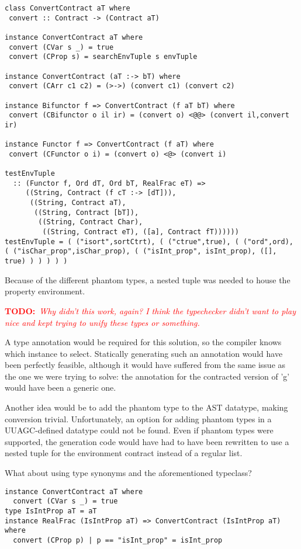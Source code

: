\documentclass[10pt]{report}
\newcommand{\annotate}[3]{
	\begin{scriptsize}
	\textcolor{#1}{\textbf{#2}~\textit{#3}}
	\end{scriptsize}\newline}
\newcommand{\todo}[1]{\annotate{red} {TODO:} {#1}}
\begin{document}
\begin{lstlisting}[caption=Attempt at using a typeclass to recover the extra type information.]
class ConvertContract aT where
 convert :: Contract -> (Contract aT)

instance ConvertContract aT where
 convert (CVar s _) = true
 convert (CProp s) = searchEnvTuple s envTuple

instance ConvertContract (aT :-> bT) where
 convert (CArr c1 c2) = (>->) (convert c1) (convert c2)

instance Bifunctor f => ConvertContract (f aT bT) where
 convert (CBifunctor o il ir) = (convert o) <@@> (convert il,convert ir)

instance Functor f => ConvertContract (f aT) where
 convert (CFunctor o i) = (convert o) <@> (convert i)
 
testEnvTuple
  :: (Functor f, Ord dT, Ord bT, RealFrac eT) =>
     ((String, Contract (f cT :-> [dT])),
      ((String, Contract aT),
       ((String, Contract [bT]),
        ((String, Contract Char),
         ((String, Contract eT), ([a], Contract fT))))))
testEnvTuple = ( ("isort",sortCtrt), ( ("ctrue",true), ( ("ord",ord), ( ("isChar_prop",isChar_prop), ( ("isInt_prop", isInt_prop), ([], true) ) ) ) ) )
\end{lstlisting}

Because of the different phantom types, a nested tuple was needed to house the property environment. \todo{Why didn't this work, again? I think the typechecker didn't want to play nice and kept trying to unify these types or something.}

A type annotation would be required for this solution, so the compiler knows which instance to select.
Statically generating such an annotation would have been perfectly feasible, although it would have suffered from the same issue as the one we were trying to solve: 
the annotation for the contracted version of 'g' would have been a generic one.

Another idea would be to add the phantom type to the AST datatype, making conversion trivial.
Unfortunately, an option for adding phantom types in a UUAGC-defined datatype could not be found.
Even if phantom types were supported, the generation code would have had to have been rewritten to use a nested tuple for the environment contract instead of a regular list.

What about using type synonyms and the aforementioned typeclass?

\begin{lstlisting}[caption=Attempt at using type synonyms to choose the correct instances.]
instance ConvertContract aT where
  convert (CVar s _) = true
type IsIntProp aT = aT
instance RealFrac (IsIntProp aT) => ConvertContract (IsIntProp aT) where
  convert (CProp p) | p == "isInt_prop" = isInt_prop
\end{lstlisting}
\end{document}
